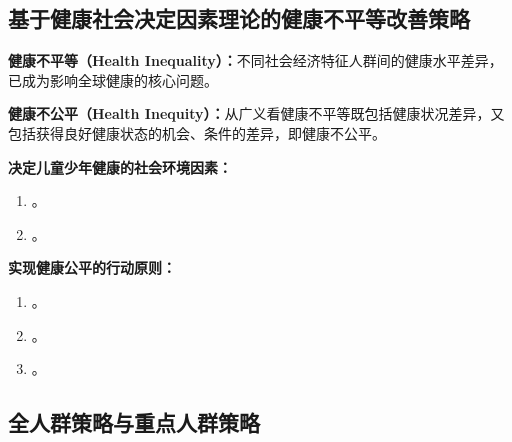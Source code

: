 \subsection{基于健康社会决定因素理论的健康不平等改善策略}

\begin{defbox}
\textbf{健康不平等（Health Inequality）：}不同社会经济特征人群间的健康水平差异，已成为影响全球健康的核心问题。

\textbf{健康不公平（Health Inequity）：}从广义看健康不平等既包括健康状况差异，又包括获得良好健康状态的机会、条件的差异，即健康不公平。
\end{defbox}

\begin{defbox}
\textbf{决定儿童少年健康的社会环境因素：}

\begin{enumerate}[leftmargin=*]
    \item {}。
    \item {}。
\end{enumerate}

\textbf{实现健康公平的行动原则：}

\begin{enumerate}[leftmargin=*]
    \item {}。
    \item {}。
    \item {}。
\end{enumerate}
\end{defbox}

\subsection{全人群策略与重点人群策略}

